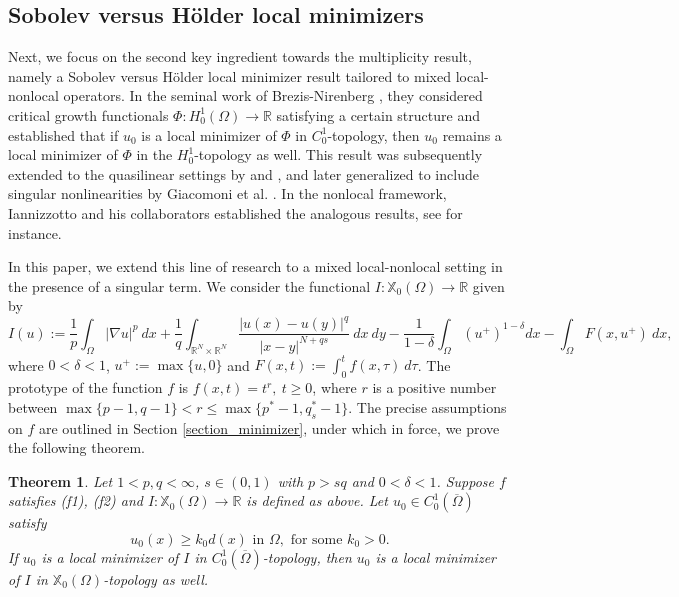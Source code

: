 \documentclass[reqno,oneside]{amsart}
\newtheorem{theorem}{Theorem}[section]
\theoremstyle{definition}
\theoremstyle{remark}
\numberwithin{equation}{section}
\newcommand{\Om} {\Omega}
\newcommand{\sr}{\mathbb{R}}
\newcommand{\rar}{\rightarrow}
\newcommand{\na} {\nabla}
\newcommand{\omc}{(\overline{\Om})}
\newcommand{\xo}{\mathbb{X}_0}
\begin{document}
\subsection{Sobolev versus H\"older local minimizers}

Next, we focus on the second key ingredient towards the multiplicity result, namely a Sobolev versus H\"older local minimizer result tailored to mixed local-nonlocal operators. In the seminal work of Brezis-Nirenberg \cite{brezis1993minimizer}, they considered critical growth functionals $\Phi: H^1_0 (\Om) \rar \sr$ satisfying a certain structure and established that if $u_0$ is a local minimizer of $\Phi$ in $C^1_0$-topology, then $u_0$ remains a local minimizer of $\Phi$ in the $H^1_0$-topology as well. This result was subsequently extended to the quasilinear settings by \cite{garcia2000minimizer, guo2003minimizer} and \cite{brock2008multiplicity}, and later generalized to include singular nonlinearities by Giacomoni et al. \cite{giacomoni2007sobolev}. In the nonlocal framework, Iannizzotto and his collaborators established the analogous results, see \cite{iannizzotto2015h, iannizzotto2020minimizer} for instance.

In this paper, we extend this line of research to a mixed local-nonlocal setting in the presence of a singular term. We consider the functional $I: \xo(\Om) \rar \sr$ given by
\begin{equation*}
    I(u):=\frac{1}{p} \int_{\Om} |\na u|^p\ dx + \frac{1}{q} \int_{\sr^N \times \sr^N} \frac{|u(x)- u(y)|^q}{|x-y|^{N+qs}}\ dx\ dy - \frac{1}{1-\delta} \int_{\Om} \left(u^+ \right)^{1-\delta} dx - \int_{\Om} F(x, u^+)\ dx,
\end{equation*}
where $0<\delta <1$, $\displaystyle u^+ := \max \{u, 0\}$ and $\displaystyle F(x,t):= \int_0^t f(x,\tau)\ d\tau$. The prototype of the function $f$ is $f(x,t)= t^r,\ t\geq 0$, where $r$ is a positive number between $\max \{ p-1, q-1\} < r \leq \max \{p^* -1, q_s^* -1 \}$. The precise assumptions on $f$ are outlined in Section \ref{section_minimizer}, under which in force, we prove the following theorem.

\begin{theorem}\label{Theorem_minimizer}
    Let $1<p,q<\infty$, $s\in (0,1)$ with $p>sq$ and $0<\delta<1$. Suppose $f$ satisfies \textit{(f1)}, \textit{(f2)} and $I: \xo(\Om) \rar \sr$ is defined as above. Let $u_0 \in C^1_0 \omc$ satisfy
    \[u_0 (x) \geq k_0 d(x) \text{ in } \Om, \text{ for some } k_0 >0.\]
    If $u_0$ is a local minimizer of $I$ in $C^1_0 \omc$-topology, then $u_0$ is a local minimizer of $I$ in $\xo (\Om)$-topology as well.
\end{theorem}
\end{document}
